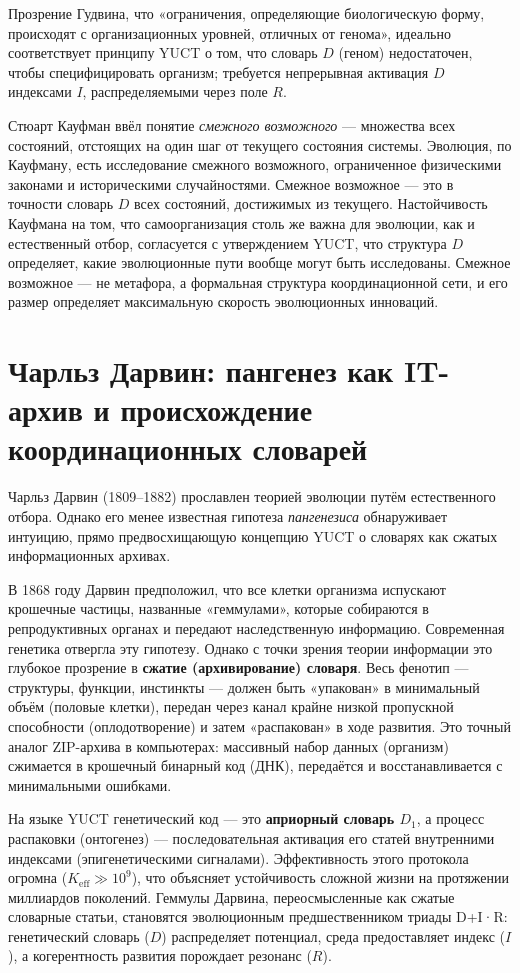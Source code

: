 \documentclass[12pt,a4paper]{article}
\begin{document}
	Прозрение Гудвина, что «ограничения, определяющие биологическую форму, происходят с организационных уровней, отличных от генома», идеально соответствует принципу YUCT о том, что словарь \(D\) (геном) недостаточен, чтобы специфицировать организм; требуется непрерывная активация \(D\) индексами \(I\), распределяемыми через поле \(R\).
	
	Стюарт Кауфман ввёл понятие \emph{смежного возможного} — множества всех состояний, отстоящих на один шаг от текущего состояния системы. Эволюция, по Кауфману, есть исследование смежного возможного, ограниченное физическими законами и историческими случайностями. Смежное возможное — это в точности словарь \(D\) всех состояний, достижимых из текущего. Настойчивость Кауфмана на том, что самоорганизация столь же важна для эволюции, как и естественный отбор, согласуется с утверждением YUCT, что структура \(D\) определяет, какие эволюционные пути вообще могут быть исследованы. Смежное возможное — не метафора, а формальная структура координационной сети, и его размер определяет максимальную скорость эволюционных инноваций.
	
	\section{Чарльз Дарвин: пангенез как IT-архив и происхождение координационных словарей}
	
	Чарльз Дарвин (1809–1882) прославлен теорией эволюции путём естественного отбора. Однако его менее известная гипотеза \emph{пангенезиса} обнаруживает интуицию, прямо предвосхищающую концепцию YUCT о словарях как сжатых информационных архивах.
	
	В 1868 году Дарвин предположил, что все клетки организма испускают крошечные частицы, названные «геммулами», которые собираются в репродуктивных органах и передают наследственную информацию. Современная генетика отвергла эту гипотезу. Однако с точки зрения теории информации это глубокое прозрение в \textbf{сжатие (архивирование) словаря}. Весь фенотип — структуры, функции, инстинкты — должен быть «упакован» в минимальный объём (половые клетки), передан через канал крайне низкой пропускной способности (оплодотворение) и затем «распакован» в ходе развития. Это точный аналог ZIP-архива в компьютерах: массивный набор данных (организм) сжимается в крошечный бинарный код (ДНК), передаётся и восстанавливается с минимальными ошибками.
	
	На языке YUCT генетический код — это \textbf{априорный словарь \(D_1\)}, а процесс распаковки (онтогенез) — последовательная активация его статей внутренними индексами (эпигенетическими сигналами). Эффективность этого протокола огромна (\(K_{\mathrm{eff}} \gg 10^9\)), что объясняет устойчивость сложной жизни на протяжении миллиардов поколений. Геммулы Дарвина, переосмысленные как сжатые словарные статьи, становятся эволюционным предшественником триады D+I·R: генетический словарь (\(D\)) распределяет потенциал, среда предоставляет индекс (\(I\)), а когерентность развития порождает резонанс (\(R\)).
	
\end{document}
